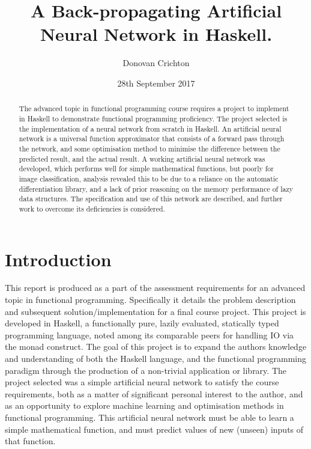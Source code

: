 \documentclass[a4paper]{article}
\title{A Back-propagating Artificial Neural Network in Haskell.}
\author{Donovan Crichton}
\date{28th September 2017}
\begin{document}
\onehalfspacing
\maketitle

\begin{abstract}
The advanced topic in functional programming course requires a project to
implement in Haskell to demonstrate functional programming proficiency. 
The project selected is the implementation of a neural network from scratch 
in Haskell. An artificial neural network is a universal function approximator 
that consists of a forward pass through the network, and some optimisation 
method to minimise the difference between the predicted result, and the actual 
result. A working artificial neural network was developed, which performs 
well for simple mathematical functions, but poorly for image classification, 
analysis revealed this to be due to a reliance on the automatic differentiation
library, and a lack of prior reasoning on the memory performance of lazy data 
structures. The specification and use of this network are described, 
and further work to overcome its deficiencies is considered.
\end{abstract}

\tableofcontents

\newpage

\section{Introduction}
This report is produced as a part of the assessment requirements for an
advanced topic in functional programming. Specifically it details the problem
description and subsequent solution/implementation for a final course project.
This project is developed in Haskell, a functionally pure, lazily evaluated,
statically typed programming language, noted among its comparable
peers for handling IO via the monad construct. The goal of this project is 
to expand the authors knowledge and understanding of both the Haskell
language, and the functional programming paradigm through the production
of a non-trivial application or library.
The project selected was a simple artificial neural network to satisfy
the course requirements, both as a matter of significant personal interest to
the author, and as an opportunity to explore machine learning and optimisation 
methods in functional programming. This artificial neural network must be able 
to learn a simple mathematical function, and must predict values of new 
(unseen) inputs of that function.
\end{document}
